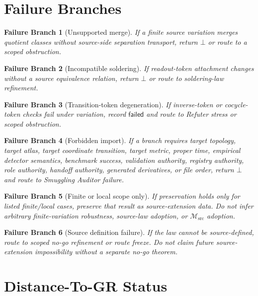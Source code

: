\documentclass[11pt]{article}
\newcommand{\Msrc}{\mathcal{M}_{\mathrm{src}}}
\newcommand{\Bot}{\bot}
\newtheorem{branch}{Failure Branch}
\begin{document}
\section{Failure Branches}

\begin{branch}[Unsupported merge]
If a finite source variation merges quotient classes without source-side
separation transport, return \(\Bot\) or route to a scoped obstruction.
\end{branch}

\begin{branch}[Incompatible soldering]
If readout-token attachment changes without a source equivalence relation,
return \(\Bot\) or route to soldering-law refinement.
\end{branch}

\begin{branch}[Transition-token degeneration]
If inverse-token or cocycle-token checks fail under variation, record
\(\mathsf{failed}\) and route to Refuter stress or scoped obstruction.
\end{branch}

\begin{branch}[Forbidden import]
If a branch requires target topology, target atlas, target coordinate
transition, target metric, proper time, empirical detector semantics,
benchmark success, validation authority, registry authority, role authority,
handoff authority, generated derivatives, or file order, return \(\Bot\) and
route to Smuggling Auditor failure.
\end{branch}

\begin{branch}[Finite or local scope only]
If preservation holds only for listed finite/local cases, preserve that result
as source-extension data. Do not infer arbitrary finite-variation robustness,
source-law adoption, or \(\Msrc\) adoption.
\end{branch}

\begin{branch}[Source definition failure]
If the law cannot be source-defined, route to scoped no-go refinement or route
freeze. Do not claim future source-extension impossibility without a separate
no-go theorem.
\end{branch}

\section{Distance-To-GR Status}
\end{document}
